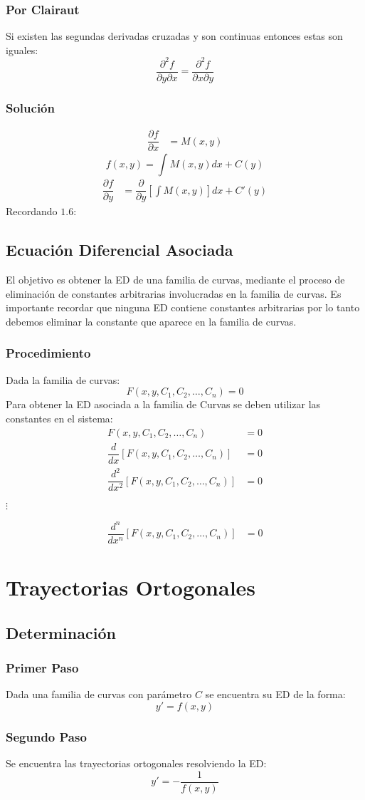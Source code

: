 \subsubsection{Por Clairaut}
Si existen las segundas derivadas cruzadas y son continuas entonces estas son iguales:
$$\dfrac{\partial^2 f}{\partial y\partial x}=\dfrac{\partial^2 f}{\partial x\partial y}$$
\subsubsection{Solución}
\begin{align*}
\dfrac{\partial f}{\partial x} & = M(x,y)
\end{align*}
\begin{equation}
f(x,y)= \int M(x,y) dx + C(y)
\end{equation}
\begin{align*}
\dfrac{\partial f}{\partial y} & = \dfrac{\partial}{\partial y}\left[\int M(x,y)\right]  dx + C'(y) 
\end{align*}
Recordando $1\texttt{.}6$:
\subsection{Ecuación Diferencial Asociada}
El objetivo es obtener la ED de una familia de curvas, mediante el proceso de eliminación de constantes arbitrarias involucradas en la familia de curvas. Es importante recordar que ninguna ED contiene constantes arbitrarias por lo tanto debemos eliminar la constante que aparece en la familia de curvas.
\subsubsection{Procedimiento}
Dada la familia de curvas:
$$F(x,y,C_1,C_2,\ldots,C_n)=0$$
Para obtener la ED asociada a la familia de Curvas se deben utilizar las constantes en el sistema:
\begin{align*}
F(x,y,C_1,C_2,\ldots,C_n) & = 0 \\
\dfrac{d}{dx}\left[ F(x,y,C_1,C_2,\ldots,C_n)\right]  & = 0 \\
\dfrac{d^2}{dx^2}\left[ F(x,y,C_1,C_2,\ldots,C_n)\right]  & = 0 
\end{align*}
\begin{center}
$\vdots $
\end{center}
\begin{align*}
\dfrac{d^n}{dx^n}\left[ F(x,y,C_1,C_2,\ldots,C_n)\right]  & = 0 
\end{align*}
\section{Trayectorias Ortogonales}
\subsection{Determinación}
\subsubsection{Primer Paso}
Dada una familia de curvas con parámetro $C$ se encuentra su ED de la forma:
$$y'=f(x,y)$$
\subsubsection{Segundo Paso}
Se encuentra las trayectorias ortogonales resolviendo la ED:
$$y' = -\dfrac{1}{f(x,y)}$$